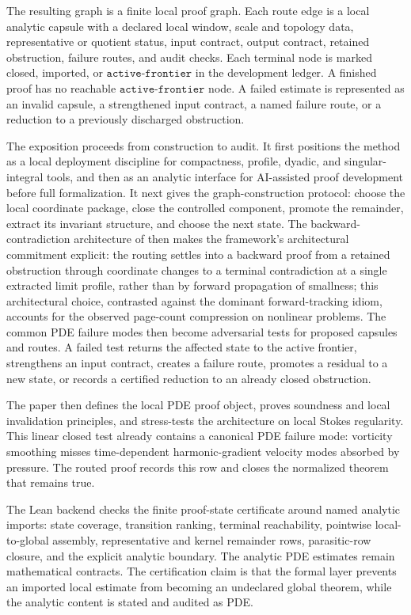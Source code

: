 \documentclass[11pt]{article}
\theoremstyle{plain}
\theoremstyle{definition}
\theoremstyle{remark}
\begin{document}
The resulting graph is a finite local proof graph.  Each route edge is a local
analytic capsule with a declared local window, scale and topology data,
representative or quotient status, input contract, output contract,
retained obstruction, failure routes, and audit checks.  Each terminal node is
marked closed, imported, or \(\texttt{active-frontier}\) in the development ledger.  A finished proof
has no reachable \(\texttt{active-frontier}\) node.  A failed estimate is represented as an
invalid capsule, a strengthened input contract, a named failure route, or a
reduction to a previously discharged obstruction.

The exposition proceeds from construction to audit.  It first positions the
method as a local deployment discipline for compactness, profile, dyadic, and
singular-integral tools, and then as an analytic interface for AI-assisted
proof development before full formalization.  It next gives the
graph-construction protocol: choose the local coordinate package, close the
controlled component, promote the remainder, extract its invariant structure,
and choose the next state.  The backward-contradiction architecture of
 then makes the framework's architectural
commitment explicit: the routing settles into a backward proof from a retained
obstruction through coordinate changes to a terminal contradiction at a single
extracted limit profile, rather than by forward propagation of smallness;
this architectural choice, contrasted against the dominant forward-tracking
idiom, accounts for the observed page-count compression on nonlinear problems.
The common PDE failure modes then become adversarial tests for proposed
capsules and routes.  A failed test returns the affected state to the active
frontier, strengthens an input contract, creates a failure route, promotes a
residual to a new state, or records a certified reduction to an already closed
obstruction.

The paper then defines the local PDE proof object, proves soundness and local
invalidation principles, and stress-tests the architecture on local Stokes
regularity.  This linear closed test already contains a canonical PDE failure
mode: vorticity smoothing misses time-dependent harmonic-gradient velocity
modes absorbed by pressure.  The routed proof records this row and closes the
normalized theorem that remains true.


The Lean backend checks the finite proof-state certificate around named analytic
imports: state coverage, transition ranking, terminal reachability,
pointwise local-to-global assembly, representative and kernel remainder rows,
parasitic-row closure, and the explicit analytic boundary.  The analytic PDE
estimates remain mathematical contracts.  The certification claim is that the
formal layer prevents an imported local estimate from becoming an undeclared
global theorem, while the analytic content is stated and audited as PDE.
\end{document}
